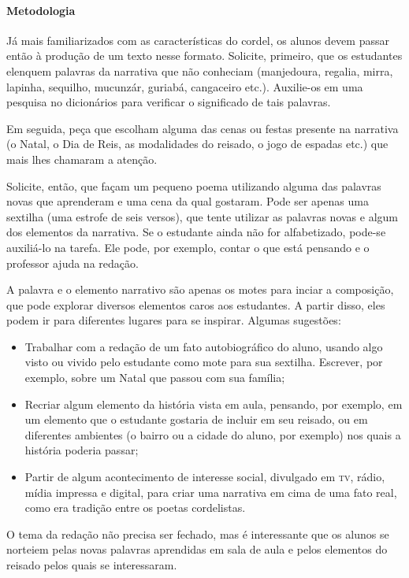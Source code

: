 \documentclass[11pt]{extarticle}
\begin{document}
\paragraph{Metodologia} Já mais familiarizados com as características do cordel, os alunos devem passar então à produção de um texto nesse formato. Solicite, primeiro, que os estudantes elenquem palavras da narrativa que não conheciam (manjedoura, regalia, mirra, lapinha, sequilho, mucunzár, guriabá, cangaceiro etc.). Auxilie-os em uma pesquisa no dicionários para verificar o significado de tais palavras.

Em seguida, peça que escolham alguma das cenas ou festas presente na narrativa (o Natal, o Dia de Reis, as modalidades do reisado, o jogo de espadas etc.) que mais lhes chamaram a atenção.

Solicite, então, que façam um pequeno poema utilizando alguma das palavras novas que aprenderam e uma cena da qual gostaram. Pode ser apenas uma sextilha (uma estrofe de seis versos), que tente utilizar as palavras novas e algum dos elementos da narrativa. Se o estudante ainda não for alfabetizado, pode-se auxiliá-lo na tarefa. Ele pode, por exemplo, contar o que está pensando e o professor ajuda na redação. 

A palavra e o elemento narrativo são apenas os motes para inciar a composição, que pode explorar diversos elementos caros aos estudantes. A partir disso, eles podem ir para diferentes lugares para se inspirar. Algumas sugestões:

\begin{itemize}
\item Trabalhar com a redação de um fato autobiográfico do aluno, usando algo visto ou vivido pelo estudante como mote para sua sextilha. Escrever, por exemplo, sobre um Natal que passou com sua família;

\item Recriar algum elemento da história vista em aula, pensando, por exemplo, em um elemento que o estudante gostaria de incluir em seu reisado, ou em diferentes ambientes (o bairro ou a cidade do aluno, por exemplo) nos quais a história poderia passar;

\item Partir de algum acontecimento de interesse social, divulgado em \textsc{tv}, rádio, mídia impressa e digital, para criar uma narrativa em cima de uma fato real, como era tradição entre os poetas cordelistas.
\end{itemize}

O tema da redação não precisa ser fechado, mas é interessante que os alunos se norteiem pelas novas palavras aprendidas em sala de aula e pelos elementos do reisado pelos quais se interessaram.
\end{document}
